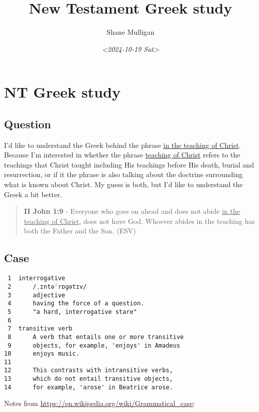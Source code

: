 \documentclass[11pt]{article}
\author{Shane Mulligan}
\date{\textit{<2024-10-19 Sat>}}
\title{New Testament Greek study}
\begin{document}
\maketitle

\section{NT Greek study}
\label{sec:orgcea93f4}

\subsection{Question}
\label{sec:org368a1b4}

I'd like to understand the Greek behind the phrase \uline{in the teaching of Christ}.
Because I'm interested in whether the phrase \uline{teaching of Christ} refers to the teachings that Christ
taught including His teachings before His death, burial and resurrection, or
if it the phrase is also talking about the doctrine surrounding what is known about Christ.
My guess is both, but I'd like to understand the Greek a bit better.

\begin{quote}
\textbf{II John 1:9} - Everyone who goes on ahead and does not abide \uline{in the teaching of Christ}, does not have God. Whoever abides in the teaching has both the Father and the Son. (ESV)
\end{quote}

\subsection{Case}
\label{sec:org792cb64}

\begin{verbatim}
 1  interrogative
 2      /ˌɪntəˈrɒɡətɪv/
 3      adjective
 4      having the force of a question.
 5      "a hard, interrogative stare"
 6  
 7  transitive verb
 8      A verb that entails one or more transitive
 9      objects, for example, 'enjoys' in Amadeus
10      enjoys music.
11  
12      This contrasts with intransitive verbs,
13      which do not entail transitive objects,
14      for example, 'arose' in Beatrice arose.
\end{verbatim}

Notes from \url{https://en.wikipedia.org/wiki/Grammatical\_case}:
\end{document}
